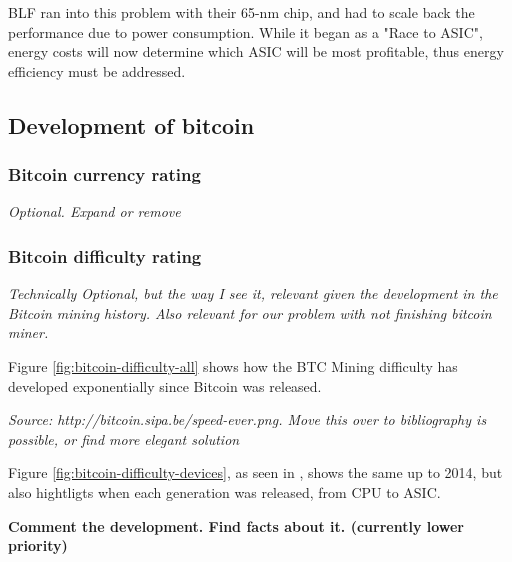 BLF ran into this problem with their 65-nm chip, and had to scale back the performance due to power consumption.
While it began as a "Race to ASIC", energy costs will now determine which ASIC will be most profitable, thus energy efficiency must be addressed.

\cite{bespoke-silicon}

\subsection{Development of bitcoin}

\subsubsection{Bitcoin currency rating}
\textit{Optional. Expand or remove}

\subsubsection{Bitcoin difficulty rating}

\textit{Technically Optional, but the way I see it, relevant given the development in the Bitcoin mining history. Also relevant for our problem with not finishing bitcoin miner.}

Figure \ref{fig:bitcoin-difficulty-all} shows how the BTC Mining difficulty has developed exponentially since Bitcoin was released. 

\textit{Source: http://bitcoin.sipa.be/speed-ever.png. Move this over to bibliography is possible, or find more elegant solution}

Figure \ref{fig:bitcoin-difficulty-devices}, as seen in \cite{bespoke-silicon}, shows the same up to 2014, but also hightligts when each generation was released, from CPU to ASIC.

\textbf{Comment the development. Find facts about it. (currently lower priority)}


%

